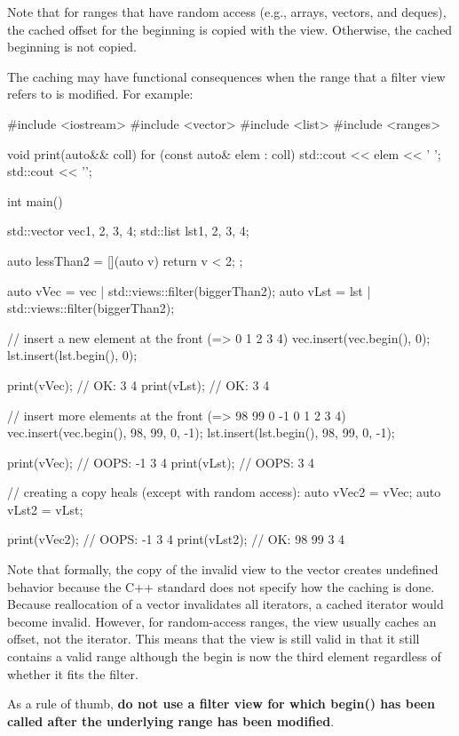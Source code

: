 Note that for ranges that have random access (e.g., arrays, vectors, and deques), the cached offset for the beginning is copied with the view. Otherwise, the cached beginning is not copied.

The caching may have functional consequences when the range that a filter view refers to is modified.
For example:


\begin{cpp}
#include <iostream>
#include <vector>
#include <list>
#include <ranges>

void print(auto&& coll)
{
	for (const auto& elem : coll) {
		std::cout << elem << ' ';
	}
	std::cout << '\n';
}

int main()
{
	std::vector vec{1, 2, 3, 4};
	std::list lst{1, 2, 3, 4};
	
	auto lessThan2 = [](auto v){
		return v < 2;
	};
	
	auto vVec = vec | std::views::filter(biggerThan2);
	auto vLst = lst | std::views::filter(biggerThan2);
	
	// insert a new element at the front (=> 0 1 2 3 4)
	vec.insert(vec.begin(), 0);
	lst.insert(lst.begin(), 0);
	
	print(vVec); // OK: 3 4
	print(vLst); // OK: 3 4
	
	// insert more elements at the front (=> 98 99 0 -1 0 1 2 3 4)
	vec.insert(vec.begin(), {98, 99, 0, -1});
	lst.insert(lst.begin(), {98, 99, 0, -1});
	
	print(vVec); // OOPS: -1 3 4
	print(vLst); // OOPS: 3 4
	
	// creating a copy heals (except with random access):
	auto vVec2 = vVec;
	auto vLst2 = vLst;
	
	print(vVec2); // OOPS: -1 3 4
	print(vLst2); // OK: 98 99 3 4
}
\end{cpp}

Note that formally, the copy of the invalid view to the vector creates undefined behavior because the C++ standard does not specify how the caching is done. Because reallocation of a vector invalidates all iterators, a cached iterator would become invalid. However, for random-access ranges, the view usually caches an offset, not the iterator. This means that the view is still valid in that it still contains a valid range although the begin is now the third element regardless of whether it fits the filter.

As a rule of thumb, \textbf{do not use a filter view for which begin() has been called after the underlying range has been modified}.

